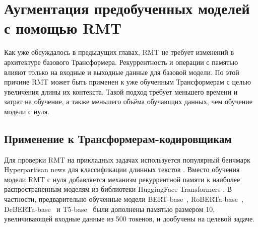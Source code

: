 \chapter{Аугментация предобученных моделей с помощью RMT}\label{ch:ch3}

Как уже обсуждалось в предыдущих главах, RMT не требует изменений в архитектуре базового Трансформера. Рекуррентность и операции с памятью влияют только на входные и выходные данные для базовой модели. По этой причине RMT может быть применен к уже обученным Трансформерам с целью увеличения длины их контекста. Такой подход требует меньшего времени и затрат на обучение, а также меньшего объёма обучающих данных, чем обучение модели с нуля. 

\section{Применение к Трансформерам-кодировщикам}\label{sec:ch3/sect1}

Для проверки RMT на прикладных задачах используется популярный бенчмарк Hyperpartisan news для классификации длинных текстов \cite{kiesel2019semeval}. Вместо обучения модели RMT с нуля добавляется механизм рекуррентной памяти к наиболее распространенным моделям из библиотеки HuggingFace Transformers \cite{wolf2020transformers}. В частности, предварительно обученные модели BERT-base~\cite{devlin2019bert}, RoBERTa-base~\cite{liu2019roberta}, DeBERTa-base~\cite{he2020deberta} и T5-base~\cite{roberts2019exploring} были дополнены памятью размером 10, увеличивающей входные данные из 500 токенов, и дообучены на целевой задаче.

